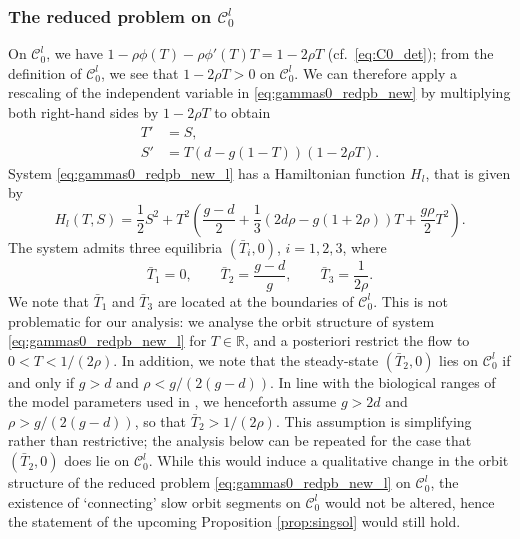 \documentclass[a4paper,10pt,abstract=true,parskip=true]{scrartcl}
\theoremstyle{remark}
\numberwithin{equation}{section}
\numberwithin{thm}{section}
\begin{document}
\subsubsection{The reduced problem on \texorpdfstring{$\mathcal{C}_0^l$}{C0l}} \label{sec:redC0l}
On $\mathcal{C}_0^l$, we have \mbox{$1-\rho \phi(T)-\rho \phi'(T)T = 1-2\rho T$} (cf.~\eqref{eq:C0_det}); from the definition of $\mathcal{C}_0^l$, we see that $1 - 2 \rho T > 0$ on $\mathcal{C}_0^l$. We can therefore apply a rescaling of the independent variable in \eqref{eq:gammas0_redpb_new} by multiplying both right-hand sides by $1-2\rho T$ to obtain
\begin{subequations}\label{eq:gammas0_redpb_new_l}
    \begin{align}
        T' &= S,\\
        S' &= T\left( d-g(1-T)\right)(1-2\rho T).
    \end{align}
\end{subequations}
System \eqref{eq:gammas0_redpb_new_l} has a Hamiltonian function $H_l$, that is given by
\begin{equation}\label{eq:C0l_Hamiltonian}
    H_l(T,S) = \frac{1}{2}S^2 + T^2 \left(\frac{g-d}{2} + \frac{1}{3}(2 d \rho -g(1+2\rho)) T + \frac{g \rho}{2} T^2\right).
\end{equation}
The system admits three equilibria $(\bar{T}_i,0)$, $i=1,2,3$, where
\begin{equation}\label{eq:equilibria_redpb}
\bar{T}_1 = 0, \qquad \bar{T}_2=\frac{g-d}{g}, \qquad \bar{T}_3 = \frac{1}{2 \rho}.
\end{equation}
We note that $\bar{T}_1$ and $\bar{T}_3$ are located at the boundaries of $\mathcal{C}_0^l$. This is not problematic for our analysis: we analyse the orbit structure of system \eqref{eq:gammas0_redpb_new_l} for $T \in \mathbb{R}$, and a posteriori restrict the flow to $0 < T <1/(2\rho)$. In addition, we note that the steady-state $(\bar{T}_2,0)$ lies on $\mathcal{C}_0^l$ if and only if $g>d$ and $\rho<g/(2(g-d))$. In line with the biological ranges of the model parameters used in \cite{GIS_2026}, we henceforth assume $g > 2 d$ and $\rho > g/(2(g-d))$, so that $\bar{T}_2 > 1/(2 \rho)$. This assumption is simplifying rather than restrictive; the analysis below can be repeated for the case that $(\bar{T}_2,0)$ does lie on $\mathcal{C}_0^l$. While this would induce a qualitative change in the orbit structure of the reduced problem \eqref{eq:gammas0_redpb_new_l} on $\mathcal{C}_0^l$, the existence of `connecting' slow orbit segments on $\mathcal{C}_0^l$ would not be altered, hence the statement of the upcoming Proposition \ref{prop:singsol} would still hold.\\ 
\end{document}
